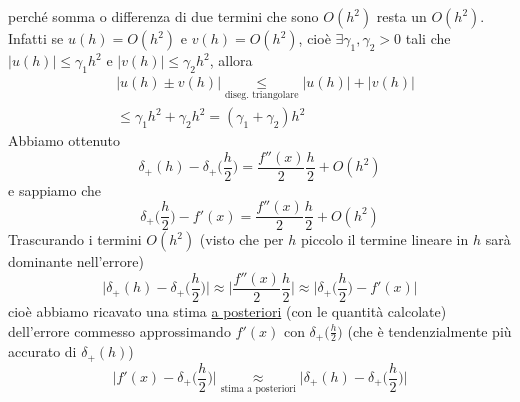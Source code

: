 \documentclass[12pt,a4paper]{article}
\begin{document}
perché somma o differenza di due termini che sono
$O(h^2)$ resta un $O(h^2)$.\\
Infatti se $u(h)=O(h^2)$ e $v(h)=O(h^2)$, cioè $\exists \gamma_1, \gamma_2 > 0$ tali che $|u(h)|\leq \gamma_1 h^2$ e $|v(h)|\leq \gamma_2 h^2$, allora
\begin{equation*}
    \begin{split}
        & |u(h) \pm v(h)| \underset{\text{diseg. triangolare}}{\leq} |u(h)|+|v(h)| \\
        & \leq \gamma_1 h^2 + \gamma_2 h^2 = (\gamma_1 + \gamma_2) h^2
    \end{split}    
\end{equation*}
Abbiamo ottenuto
\begin{equation*}
    \delta_+(h) - \delta_+\biggl(\frac{h}{2}\biggr) = \frac{f''(x)}{2}\frac{h}{2} + O(h^2)
\end{equation*}
e sappiamo che 
\begin{equation*}
    \delta_+\biggl(\frac{h}{2}\biggr) - f'(x) = \frac{f''(x)}{2}\frac{h}{2} + O(h^2)
\end{equation*}
Trascurando i termini $O(h^2)$ (visto che per $h$ piccolo il termine lineare in $h$ sarà dominante nell'errore)
\begin{equation*}
    \biggl|\delta_+(h) - \delta_+\biggl(\frac{h}{2}\biggr)\biggr| \approx \biggl|\frac{f''(x)}{2}\frac{h}{2}\biggr| \approx \biggl|\delta_+\biggl(\frac{h}{2}\biggr) - f'(x) \biggr|
\end{equation*}
cioè abbiamo ricavato una stima \uline{a posteriori} (con le quantità calcolate) dell'errore commesso approssimando $f'(x)$ con $\delta_+\bigl(\frac{h}{2}\bigr)$ (che è tendenzialmente più accurato di $\delta_+(h)$)
\begin{equation*}
     \biggl|f'(x) - \delta_+\biggl(\frac{h}{2}\biggr) \biggr| \underset{\text{stima a posteriori}}{\approx} \biggl|\delta_+(h) - \delta_+\biggl(\frac{h}{2}\biggr)\biggr|
\end{equation*}
\end{document}
